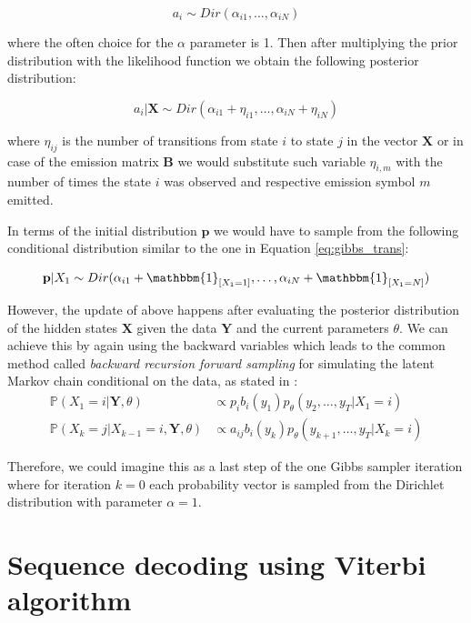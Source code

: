 \begin{equation}
    a_i \sim Dir(\alpha_{i1},\ldots,\alpha_{iN})
\end{equation}

where the often choice for the $\alpha$ parameter is 1. Then after multiplying the prior distribution with the likelihood function 
we obtain the following posterior distribution:

\begin{equation} \label{eq:gibbs_trans}
    a_i|\textbf{X} \sim Dir(\alpha_{i1} + \eta_{i1},\ldots,\alpha_{iN} + \eta_{iN})
\end{equation}

where $\eta_{ij}$ is the number of transitions from state $i$ to state $j$ in the vector $\textbf{X}$ or in case of the emission matrix $\textbf{B}$ we would substitute such variable $\eta_{i,m}$ with 
the number of times the state $i$ was observed and respective emission symbol $m$ emitted. \citep{Rydén2008}

In terms of the initial distribution $\textbf{p}$ we would have to sample from the following conditional distribution similar to the one 
in Equation \ref{eq:gibbs_trans}:

\begin{equation}
    \textbf{p}|X_1 \sim Dir(\alpha_{i1} + \mathbbm{1}_{[X_1=1]},\ldots,\alpha_{iN} + \mathbbm{1}_{[X_1=N]})
\end{equation}

However, the update of above happens after evaluating the posterior distribution of the hidden states $\textbf{X}$ given the data $\textbf{Y}$ and the current parameters $\theta$.
We can achieve this by again using the backward variables which leads to the common method called \textit{backward recursion forward sampling} for simulating the 
latent Markov chain conditional on the data, as stated in \citep{Chib1996}:
\begin{align}
    \mathbb{P}(X_1=i|\textbf{Y},\theta) & \propto p_i b_i(y_1) p_{\theta}(y_2,\ldots,y_T|X_1=i) \\
    \mathbb{P}(X_k=j|X_{k-1}=i,\textbf{Y},\theta) & \propto a_{ij} b_i(y_k) p_{\theta}(y_{k+1},\ldots,y_T|X_k=i)
\end{align}

Therefore, we could imagine this as a last step of the one Gibbs sampler iteration where for iteration $k=0$ each probability vector is sampled from the Dirichlet distribution
with parameter $\alpha=1$.


\section{Sequence decoding using Viterbi algorithm}

